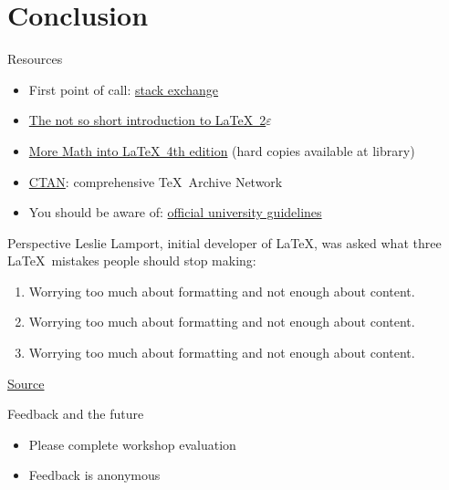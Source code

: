 \section*{Conclusion}

\addtocounter{section}{1}

\begin{frame}{Resources}
  \begin{itemize}
    \item First point of call:
      \href{https://tex.stackexchange.com/}{stack exchange}
    \item \href{https://tobi.oetiker.ch/lshort/lshort.pdf}%
      {The not so short introduction to \LaTeX\ 2$\varepsilon$}
    \item \href{https://link.springer.com/content/pdf/10.1007\%2F978-0-387-68852-7.pdf}%
      {More Math into \LaTeX\ 4th edition} (hard copies available at library)
    \item \href{https://www.ctan.org/}{CTAN}: comprehensive \TeX\ Archive
      Network
    \item You should be aware of:
      \href{https://www.ncl.ac.uk/students/progress/assets/documents/GuidelinesfortheSubmissionandFormatofThesis-January2018.pdf}%
      {official university guidelines}
  \end{itemize}
\end{frame}

\begin{frame}{Perspective}
  Leslie Lamport, initial developer of \LaTeX, was asked what three \LaTeX\
  mistakes people should stop making:
  \begin{enumerate}
    \item Worrying too much about formatting and not enough about content.
    \item Worrying too much about formatting and not enough about content.
    \item Worrying too much about formatting and not enough about content.
  \end{enumerate}
  \href{https://www.microsoft.com/en-us/research/uploads/prod/2016/12/TeX-changed-the-face-of-Mathematics.pdf}%
  {Source}
\end{frame}

\begin{frame}{Feedback and the future}
  \begin{itemize}
    \item Please complete workshop evaluation
    \item Feedback is anonymous
  \end{itemize}
\end{frame}

